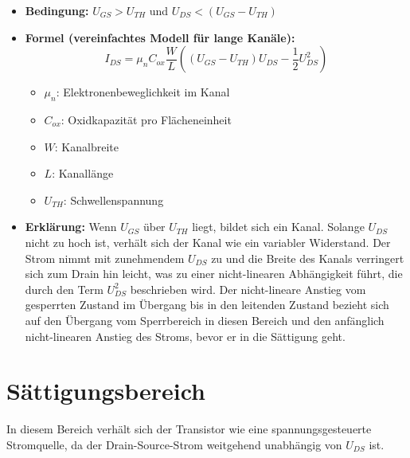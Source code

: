 \documentclass{scrarticle}
\numberwithin{equation}{section}
\begin{document}
\begin{itemize}
	\item \textbf{Bedingung:} $U_{GS} > U_{TH}$ und $U_{DS} < (U_{GS} - U_{TH})$
	\item \textbf{Formel (vereinfachtes Modell für lange Kanäle):}
	\begin{equation*}
		I_{DS} = \mu_n C_{ox} \frac{W}{L} \left( (U_{GS} - U_{TH})U_{DS} - \frac{1}{2}U_{DS}^2 \right)
	\end{equation*}
	\begin{itemize}
		\item $\mu_n$: Elektronenbeweglichkeit im Kanal
		\item $C_{ox}$: Oxidkapazität pro Flächeneinheit
		\item $W$: Kanalbreite
		\item $L$: Kanallänge
		\item $U_{TH}$: Schwellenspannung
	\end{itemize}
	\item \textbf{Erklärung:} Wenn $U_{GS}$ über $U_{TH}$ liegt, bildet sich ein Kanal. Solange $U_{DS}$ nicht zu hoch ist, verhält sich der Kanal wie ein variabler Widerstand. Der Strom nimmt mit zunehmendem $U_{DS}$ zu und die Breite des Kanals verringert sich zum Drain hin leicht, was zu einer nicht-linearen Abhängigkeit führt, die durch den Term $U_{DS}^2$ beschrieben wird. Der nicht-lineare Anstieg vom gesperrten Zustand im Übergang bis in den leitenden Zustand bezieht sich auf den Übergang vom Sperrbereich in diesen Bereich und den anfänglich nicht-linearen Anstieg des Stroms, bevor er in die Sättigung geht.
\end{itemize}

\section{Sättigungsbereich}
In diesem Bereich verhält sich der Transistor wie eine spannungsgesteuerte Stromquelle, da der Drain-Source-Strom weitgehend unabhängig von $U_{DS}$ ist.
\end{document}
